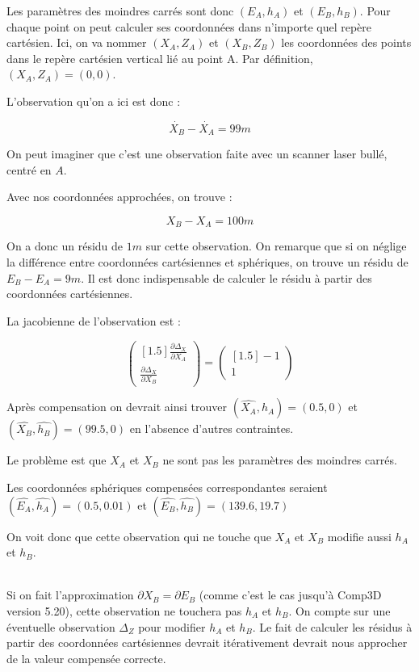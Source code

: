 \documentclass[french]{report}
\begin{document}
Les paramètres des moindres carrés sont donc $(E_A, h_A)$ et $(E_B, h_B)$.
Pour chaque point on peut calculer ses coordonnées dans n'importe quel repère cartésien.
Ici, on va nommer $(X_A, Z_A)$ et $(X_B, Z_B)$ les coordonnées des points dans le repère cartésien vertical lié au point A. Par définition, $(X_A, Z_A) = (0, 0)$.

L'observation qu'on a ici est donc :

$$\dot{X_B} - \dot{X_A} = 99m$$

On peut imaginer que c'est une observation faite avec un scanner laser bullé, centré en $A$.

Avec nos coordonnées approchées, on trouve :

$$X_B - X_A = 100m$$

On a donc un résidu de $1m$ sur cette observation. On remarque que si on néglige la différence entre coordonnées cartésiennes et sphériques, on trouve un résidu de $E_B - E_A = 9m$. Il est donc indispensable de calculer le résidu à partir des coordonnées cartésiennes.

La jacobienne de l'observation est :

$$\begin{pmatrix}[1.5] \frac{\partial \Delta_X}{\partial X_A}\\ \frac{\partial \Delta_X}{\partial X_B} \end{pmatrix}
=\begin{pmatrix}[1.5] -1\\ 1 \end{pmatrix}$$

Après compensation on devrait ainsi trouver $(\hat{X_A}, \hat{h_A}) = (0.5, 0)$ et $(\hat{X_B}, \hat{h_B}) = (99.5, 0)$ en l'absence d'autres contraintes.

Le problème est que $X_A$ et $X_B$ ne sont pas les paramètres des moindres carrés.

Les coordonnées sphériques compensées correspondantes seraient
$(\hat{E_A}, \hat{h_A}) = (0.5, 0.01)$ et $(\hat{E_B}, \hat{h_B}) = (139.6, 19.7)$

On voit donc que cette observation qui ne touche que $X_A$ et $X_B$ modifie aussi $h_A$ et $h_B$.

\ \\

Si on fait l'approximation $\partial X_B = \partial E_B$ (comme c'est le cas jusqu'à Comp3D version 5.20),
cette observation ne touchera pas $h_A$ et $h_B$. On compte sur une éventuelle observation $\Delta_Z$ pour modifier $h_A$ et $h_B$. Le fait de calculer les résidus à partir des coordonnées cartésiennes devrait itérativement devrait nous approcher de la valeur compensée correcte.
\end{document}
